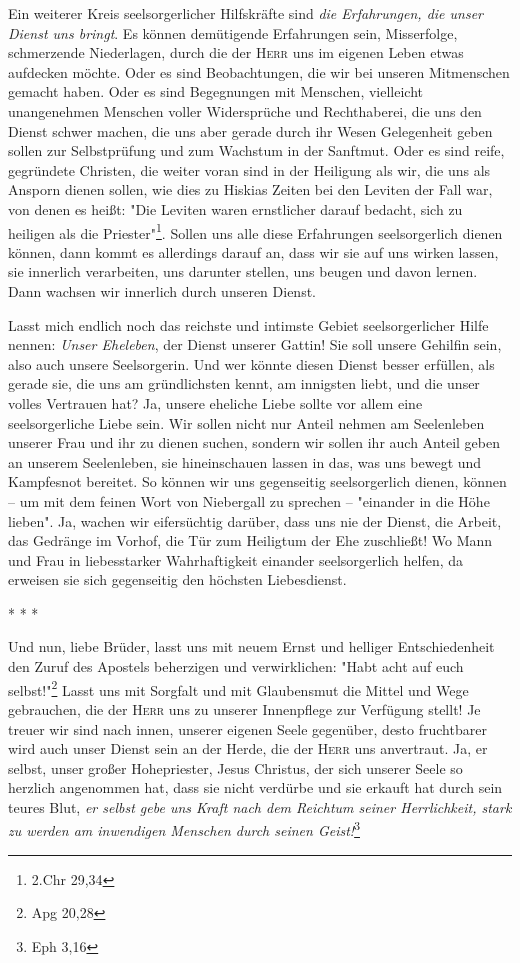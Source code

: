 \documentclass[a5paper,openany]{book}
\begin{document}
\par
Ein weiterer Kreis seelsorgerlicher Hilfskräfte sind \emph{die Erfahrungen, die unser Dienst uns bringt}. Es können demütigende Erfahrungen sein, Misserfolge, schmerzende Niederlagen, durch die der \textsc{Herr} uns im eigenen Leben etwas aufdecken möchte. Oder es sind Beobachtungen, die wir bei unseren Mitmenschen gemacht haben. Oder es sind Begegnungen mit Menschen, vielleicht unangenehmen Menschen voller Widersprüche und Rechthaberei, die uns den Dienst schwer machen, die uns aber gerade durch ihr Wesen Gelegenheit geben sollen zur Selbstprüfung und zum Wachstum in der Sanftmut. Oder es sind reife, gegründete Christen, die weiter voran sind in der Heiligung als wir, die uns als Ansporn dienen sollen, wie dies zu Hiskias Zeiten bei den Leviten der Fall war, von denen es heißt: "Die Leviten waren ernstlicher darauf bedacht, sich zu heiligen als die Priester"\footnote{2.Chr 29,34}. Sollen uns alle diese Erfahrungen seelsorgerlich dienen können, dann kommt es allerdings darauf an, dass wir sie auf uns wirken lassen, sie innerlich verarbeiten, uns darunter stellen, uns beugen und davon lernen. Dann wachsen wir innerlich durch unseren Dienst.
\par
Lasst mich endlich noch das reichste und intimste Gebiet seelsorgerlicher Hilfe nennen: \emph{Unser Eheleben}, der Dienst unserer Gattin! Sie soll unsere Gehilfin sein, also auch unsere Seelsorgerin. Und wer könnte diesen Dienst besser erfüllen, als gerade sie, die uns am gründlichsten kennt, am innigsten liebt, und die unser volles Vertrauen hat? Ja, unsere eheliche Liebe sollte vor allem eine seelsorgerliche Liebe sein. Wir sollen nicht nur Anteil nehmen am Seelenleben unserer Frau und ihr zu dienen suchen, sondern wir sollen ihr auch Anteil geben an unserem Seelenleben, sie hineinschauen lassen in das, was uns bewegt und Kampfesnot bereitet. So können wir uns gegenseitig seelsorgerlich dienen, können – um mit dem feinen Wort von Niebergall zu sprechen – "einander in die Höhe lieben". Ja, wachen wir eifersüchtig darüber, dass uns nie der Dienst, die Arbeit, das Gedränge im Vorhof, die Tür zum Heiligtum der Ehe zuschließt! Wo Mann und Frau in liebesstarker Wahrhaftigkeit einander seelsorgerlich helfen, da erweisen sie sich gegenseitig den höchsten Liebesdienst.
\begin{center}
* * *
\end{center}
\par
Und nun, liebe Brüder, lasst uns mit neuem Ernst und helliger Entschiedenheit den Zuruf des Apostels beherzigen und verwirklichen: "Habt acht auf euch selbst!"\footnote{Apg 20,28} Lasst uns mit Sorgfalt und mit Glaubensmut die Mittel und Wege gebrauchen, die der \textsc{Herr} uns zu unserer Innenpflege zur Verfügung stellt! Je treuer wir sind nach innen, unserer eigenen Seele gegenüber, desto fruchtbarer wird auch unser Dienst sein an der Herde, die der \textsc{Herr} uns anvertraut. Ja, er selbst, unser großer Hohepriester, Jesus Christus, der sich unserer Seele so herzlich angenommen hat, dass sie nicht verdürbe und sie erkauft hat durch sein teures Blut, \emph{er selbst gebe uns Kraft nach dem Reichtum seiner Herrlichkeit, stark zu werden am inwendigen Menschen durch seinen Geist!}\footnote{Eph 3,16}
\end{document}
